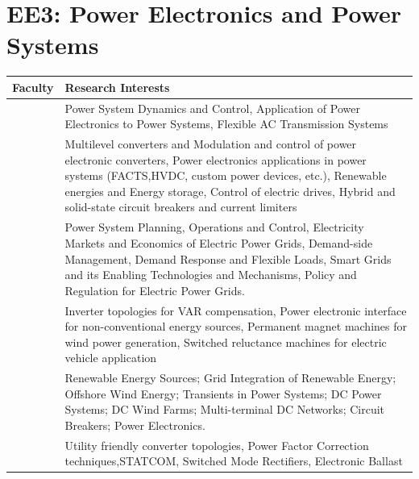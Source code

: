 \documentclass[openany]{book} %
\begin{document}
\section{EE3: Power Electronics and Power Systems}
\begin{tabular}{p{4.5cm} p{9cm}}

\hline 
\hline 
Faculty & Research Interests \\ 
\hline 
\hline 


\href{https://www.ee.iitb.ac.in/wiki/faculty/anil}{\color{blue}{Prof. Anil Kulkarni }} & Power System Dynamics and Control, Application of Power Electronics to Power Systems, Flexible AC Transmission Systems \\ 
\hline 


\href{https://www.ee.iitb.ac.in/wiki/faculty/ashukla}{\color{blue}{Prof. Anshuman Shukla }} & Multilevel converters and Modulation and control of power electronic converters, Power electronics applications in power systems (FACTS,HVDC, custom power devices, etc.), Renewable energies and Energy storage, Control of electric drives, Hybrid and solid-state circuit breakers and current limiters \\ 
\hline 


\href{https://www.ee.iitb.ac.in/web/faculty/homepage/anu}{\color{blue}{Prof. Anupama Kowli }}  & Power System Planning, Operations and Control, Electricity Markets and Economics of Electric Power Grids, Demand-side Management, Demand
Response and Flexible Loads, Smart Grids and its Enabling Technologies and Mechanisms, Policy and Regulation for Electric Power Grids. \\ 
\hline

\href{https://www.ee.iitb.ac.in/wiki/faculty/bgf}{\color{blue}{Prof. Baylon G. Fernandes}} & Inverter topologies for VAR compensation, Power electronic interface for non-conventional energy sources, Permanent magnet machines for
wind power generation, Switched reluctance machines for electric vehicle application \\ 
\hline 

 
\href{https://www.ee.iitb.ac.in/web/faculty/homepage/hjbahirat}{\color{blue}{Prof. Himanshu J. Bahirat }} & Renewable Energy Sources; Grid Integration of Renewable Energy; Offshore Wind Energy; Transients in Power Systems; DC Power Systems;
DC Wind Farms; Multi-terminal DC Networks; Circuit Breakers; Power Electronics. \\ 
\hline 

\href{https://www.ee.iitb.ac.in/wiki/faculty/kishore}{\color{blue}{Prof. Kishore Chatterjee}} & Utility friendly converter topologies, Power Factor Correction techniques,STATCOM, Switched Mode Rectifiers, Electronic Ballast \\ 
\hline 



\end{tabular}
\end{document}
